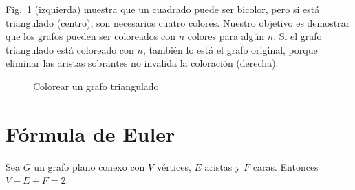 \begin{example}
Fig.~\ref{f.five-triangular-graph} (izquierda) muestra que un cuadrado puede ser bicolor, pero si está triangulado (centro), son necesarios cuatro colores. Nuestro objetivo es demostrar que los grafos pueden ser coloreados con $n$ colores para algún $n$. Si el grafo triangulado está coloreado con $n$, también lo está el grafo original, porque eliminar las aristas sobrantes no invalida la coloración (derecha).
\end{example}

\begin{figure}[h]
\begin{center}
\end{center}
\caption{Colorear un grafo triangulado}\label{f.five-triangular-graph}
\end{figure}


\section{Fórmula de Euler}\label{s.euler}

\begin{theorem}\label{thm.euler} Sea $G$ un grafo plano conexo con $V$ vértices, $E$ aristas y $F$ caras. Entonces $V-E+F=2$.
\end{theorem}

